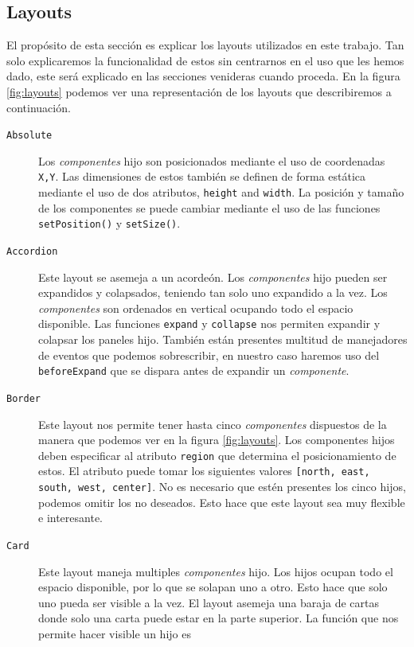 	\subsection{Layouts}
		El propósito de esta sección es explicar los layouts utilizados en este trabajo. Tan solo explicaremos la funcionalidad de estos sin
		centrarnos en el uso que les hemos dado, este será explicado en las secciones venideras cuando proceda. En la figura \ref{fig:layouts}
		podemos ver una representación de los layouts que describiremos a continuación.
		\begin{description} 
			\item[\texttt{Absolute}] Los \emph{componentes} hijo son posicionados mediante el uso de coordenadas \texttt{X,Y}. Las
			  dimensiones de estos también se definen de forma estática mediante el uso de dos atributos, \texttt{height} and
			  \texttt{width}. La posición y tamaño de los componentes se puede cambiar mediante el uso de las funciones
			  \texttt{setPosition()} y \texttt{setSize()}.
			\item[\texttt{Accordion}] Este layout se asemeja a un acordeón. Los \emph{componentes} hijo pueden ser expandidos y
			  colapsados, teniendo tan solo uno expandido a la vez. Los \emph{componentes} son ordenados en vertical ocupando todo el
			  espacio disponible. Las funciones \texttt{expand} y \texttt{collapse} nos permiten expandir y colapsar los paneles hijo.
			  También están presentes multitud de manejadores de eventos que podemos sobrescribir, en nuestro caso haremos uso del
			  \texttt{beforeExpand} que se dispara antes de expandir un \emph{componente}. 
			\item[\texttt{Border}] Este layout nos permite tener hasta cinco \emph{componentes} dispuestos de la manera que podemos ver en
			  la figura \ref{fig:layouts}.  Los componentes hijos deben especificar al atributo \texttt{region} que determina el
			  posicionamiento de estos. El atributo puede tomar los siguientes valores \texttt{[north, east, south, west, center]}. No es
			  necesario que estén presentes los cinco hijos, podemos omitir los no deseados. Esto hace que este layout sea muy flexible e
			  interesante.
			\item[\texttt{Card}] Este layout maneja multiples \emph{componentes} hijo. Los hijos ocupan todo el espacio disponible, por lo
			  que se solapan uno a otro.  Esto hace que solo uno pueda ser visible a la vez. El layout asemeja una baraja de cartas donde
			  solo una carta puede estar en la parte superior. La función que nos permite hacer visible un hijo es

\end{description}
